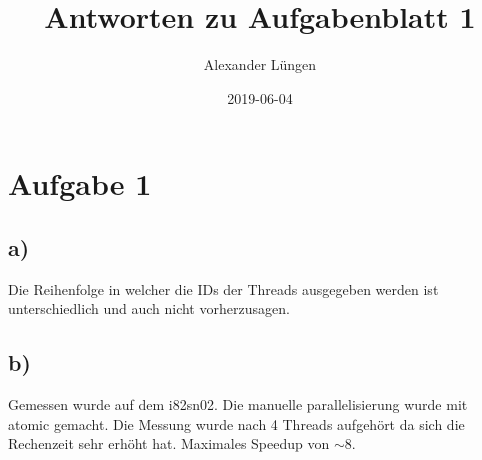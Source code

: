 \documentclass{article}
\title{Antworten zu Aufgabenblatt 1}
\date{2019-06-04}
\author{Alexander Lüngen}
\begin{document}
    \maketitle
    \newpage
    \section{Aufgabe 1}
        \subsection{a)}
        Die Reihenfolge in welcher die IDs der Threads ausgegeben werden ist unterschiedlich und auch nicht vorherzusagen.
        
        \subsection{b)}
        Gemessen wurde auf dem i82sn02. Die manuelle parallelisierung wurde mit atomic gemacht. Die Messung wurde nach 4 Threads aufgehört da sich die Rechenzeit sehr erhöht hat. Maximales Speedup von $ \sim 8 $.\\
        
\end{document}
